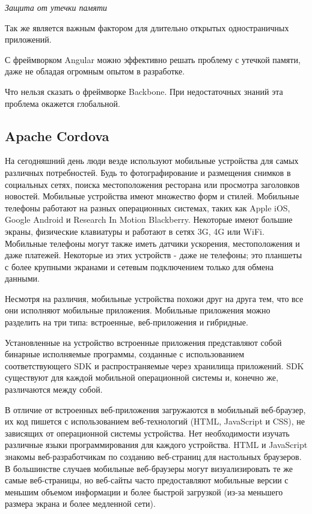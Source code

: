 {\itshape Защита от утечки памяти} 

Так же является важным фактором для длительно открытых одностраничных приложений.

С фреймворком Angular можно эффективно решать проблему с утечкой памяти, даже не обладая огромным опытом в разработке.

Что нельзя сказать о фреймворке Backbone. При недостаточных знаний эта проблема окажется глобальной.

\subsection{Apache Cordova}
На сегодняшний день люди везде используют мобильные устройства для самых различных потребностей. Будь то фотографирование и размещения снимков в социальных сетях, поиска местоположения ресторана или просмотра заголовков новостей. Мобильные устройства имеют множество форм и стилей. Мобильные телефоны работают на разных операционных системах, таких как Apple iOS, Google Android и Research In Motion Blackberry. Некоторые имеют большие экраны, физические клавиатуры и работают в сетях 3G, 4G или WiFi. Мобильные телефоны могут также иметь датчики ускорения, местоположения и даже платежей. Некоторые из этих устройств - даже не телефоны; это планшеты с более крупными экранами и сетевым подключением только для обмена данными.

Несмотря на различия, мобильные устройства похожи друг на друга тем, что все они исполняют мобильные приложения. Мобильные приложения можно разделить на три типа: встроенные, веб-приложения и гибридные.

Установленные на устройство встроенные приложения представляют собой бинарные исполняемые программы, созданные с использованием соответствующего  SDK  и  распространяемые  через  хранилища приложений. SDK существуют для каждой мобильной операционной системы и, конечно же, различаются между собой.

В отличие от встроенных веб-приложения загружаются в мобильный веб-браузер, их код пишется с использованием веб-технологий (HTML, JavaScript и CSS), не зависящих от операционной системы устройства. Нет необходимости изучать различные языки программирования для каждого устройства. HTML и JavaScript знакомы веб-разработчикам по созданию веб-страниц для настольных браузеров. В большинстве случаев мобильные веб-браузеры могут визуализировать те же самые веб-страницы, но веб-сайты часто предоставляют мобильные версии с меньшим объемом информации и более быстрой загрузкой (из-за меньшего размера экрана и более медленной сети).

